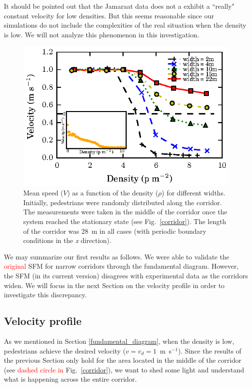 \documentclass[preprint,12pt]{elsarticle}
\begin{document}
It should be pointed out that the Jamaraat data does not a exhibit a ``really" constant velocity for low densities. But this seems reasonable since our simulations do not include the complexities of the real situation when the density is low. We will not analyze this phenomenon in this investigation. \\

\begin{figure}[htbp!]
\centering
\includegraphics[width=0.7\columnwidth]
{./speed-density_vd1_multiple_widths.eps}
\caption{\label{fundamental_diagram_speed} Mean speed ($V$) as a function of the density ($\rho$) for different widths. Initially, 
pedestrians were randomly distributed along the corridor. The measurements were taken in the middle
of the corridor once the system reached the stationary state (see Fig.~\ref{corridor}). The length of the corridor 
was 28~m in all cases (with periodic boundary conditions in the \textit{x} direction).}
\end{figure}

We may summarize our first results as follows. We were able to validate the 
\textcolor{red}{original} SFM for narrow corridors through the fundamental 
diagram. However, the SFM (in its current version) disagrees with experimental 
data as the corridors widen. We will focus in the next Section on the velocity 
profile in order to investigate this discrepancy. 

\subsection{\label{velocity_profile} Velocity profile}

As we mentioned in Section \ref{fundamental_diagram}, when the density is low, pedestrians achieve the desired velocity ($v=v_d=1$~m~s$^{-1}$). Since the results of the previous Section only hold for the area located in the middle of the corridor (see \textcolor{red}{dashed circle in} Fig.~\ref{corridor}), we want to shed some light and understand what is happening across the entire corridor.\\
\end{document}
